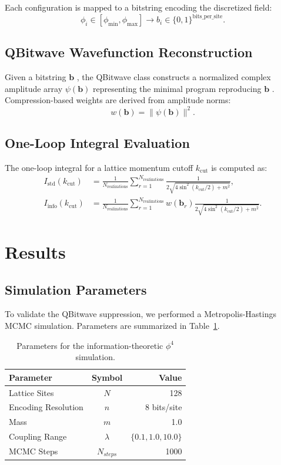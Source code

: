 \documentclass[11pt]{article}
\begin{document}
Each configuration is mapped to a bitstring encoding the discretized field:
\begin{equation}
\phi_i \in [\phi_{\min}, \phi_{\max}] \rightarrow b_i \in \{0,1\}^{\text{bits\_per\_site}}.
\end{equation}

\subsection{QBitwave Wavefunction Reconstruction}
Given a bitstring \(\mathbf{b}\) , the QBitwave class constructs a normalized complex amplitude array \(\psi(\mathbf{b})\)  representing the minimal program reproducing \(\mathbf{b}\) . Compression-based weights are derived from amplitude norms:
\begin{equation}
w(\mathbf{b}) = \|\psi(\mathbf{b})\|^2.
\end{equation}

\subsection{One-Loop Integral Evaluation}
The one-loop integral for a lattice momentum cutoff \(k_\text{cut}\)  is computed as:
\begin{align}
I_\text{std}(k_\text{cut}) &= \frac{1}{N_\text{realizations}} \sum_{r=1}^{N_\text{realizations}} \frac{1}{2\sqrt{4 \sin^2(k_\text{cut}/2) + m^2}}, \\
I_\text{info}(k_\text{cut}) &= \frac{1}{N_\text{realizations}} \sum_{r=1}^{N_\text{realizations}} w(\mathbf{b}_r) \frac{1}{2\sqrt{4 \sin^2(k_\text{cut}/2) + m^2}}.
\end{align}

\section{Results}
\subsection{Simulation Parameters}
To validate the QBitwave suppression, we performed a Metropolis-Hastings MCMC simulation. Parameters are summarized in Table~\ref{tab:params}.

\begin{table}[h]
\centering
\begin{tabular}{|l|c|r|}
\hline
Parameter & Symbol & Value \\ \hline
Lattice Sites & \(N\)  & 128 \\
Encoding Resolution & \(n\)  & 8 bits/site \\
Mass & \(m\)  & 1.0 \\
Coupling Range & \(\lambda\)  & \(\{0.1, 1.0, 10.0\}\)  \\
MCMC Steps & \(N_{steps}\)  & 1000 \\ \hline
\end{tabular}
\caption{Parameters for the information-theoretic \(\phi^4\)  simulation.}
\label{tab:params}
\end{table}
\end{document}
